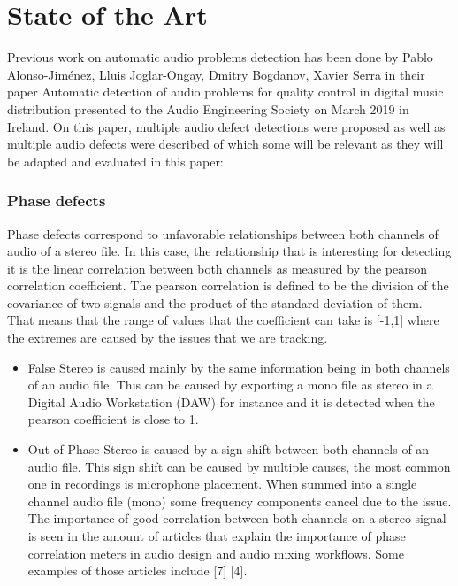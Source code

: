 \normallinespacing

\chapter{State of the Art}

Previous work on automatic audio problems detection has been done by Pablo Alonso-Jiménez, Lluis Joglar-Ongay, Dmitry Bogdanov, 
Xavier Serra in their paper Automatic detection of audio problems for quality control in digital music distribution presented to 
the Audio Engineering Society on March 2019 in Ireland. On this paper, multiple audio defect detections were proposed as well as 
multiple audio defects were described of which some will be relevant as they will be adapted and evaluated in this paper: \\
\subsection{Phase defects}
Phase defects correspond to unfavorable relationships between both channels of audio of a stereo file. In this case, 
the relationship that is interesting for detecting it is the linear correlation between both channels as measured by the 
pearson correlation coefficient. The pearson correlation is defined to be the division of the covariance of two signals 
and the product of the standard deviation of them. That means that the range of values that the coefficient can take is [-1,1] 
where the extremes are caused by the issues that we are tracking. \\
\begin{itemize}
\item False Stereo is caused mainly by the same information being in both channels of an audio file. This can be caused by 
exporting a mono file as stereo in a Digital Audio Workstation (DAW) for instance and it is detected when the pearson coefficient 
is close to 1. \\
\item Out of Phase Stereo is caused by a sign shift between both channels of an audio file. This sign shift can be caused by 
multiple causes, the most common one in recordings is microphone placement. When summed into a single channel audio file (mono) 
some frequency components cancel due to the issue. The importance of good correlation between both channels on a stereo signal is 
seen in the amount of articles that explain the importance of phase correlation meters in audio design and audio mixing workflows. 
Some examples of those articles include [7] [4]. \\
\end{itemize}
